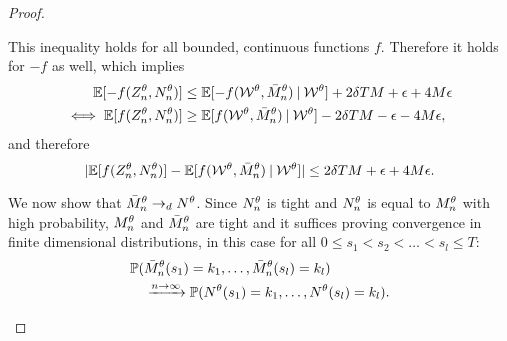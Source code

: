 \begin{proof}
\begin{proofpart}
This inequality holds for all bounded, continuous functions $f$. 
Therefore it holds for $-f$ as well, which implies
\begin{equation}
\begin{aligned}
\mathbb{E}[-f(Z_n^{\theta}, N_n^{\theta})] &\leq \mathbb{E}[-f(\mathcal{W}^{\theta}, \bar{M}_n^{\theta}) \: | \: \mathcal{W}^{\theta}]+ 2\delta T M  + \epsilon + 4M\epsilon \\
\iff  \mathbb{E}[f(Z_n^{\theta}, N_n^{\theta})] &\geq \mathbb{E}[f(\mathcal{W}^{\theta}, \bar{M}_n^{\theta}) \: | \: \mathcal{W}^{\theta}] - 2\delta T M  - \epsilon - 4M\epsilon,
\end{aligned}
\end{equation}
and therefore
\begin{equation} \label{E: Equality of Expectations}
	|\mathbb{E}[f(Z_n^{\theta}, N_n^{\theta})] - \mathbb{E}[f(\mathcal{W}^{\theta}, \bar{M}_n^{\theta}) \: | \: \mathcal{W}^{\theta}] | \leq 2\delta T M + \epsilon  + 4M\epsilon.
\end{equation}
\end{proofpart}



\begin{proofpart}
We now show that $\bar{M}_n^{\theta} \rightarrow_d N^{\theta}$.
Since $N_n^{\theta}$ is tight and $N_n^{\theta}$ is equal to $M_n^{\theta}$ with high probability,
$M_n^{\theta}$ and $\bar{M}_n^{\theta}$ are tight and it suffices proving convergence in finite dimensional distributions,
in this case for all $0 \leq s_1 < s_2 < \dots < s_l \leq T$:
\begin{equation} \label{E: convergence fdd}
\begin{aligned}
&\mathbb{P}( \bar{M}_n^{\theta}(s_1) = k_1, \dots, \bar{M}_n^{\theta}(s_l) = k_l ) \\
&\quad \xrightarrow{n \rightarrow \infty}  \mathbb{P}( N^{\theta}(s_1) = k_1, \dots, N^{\theta}(s_l) = k_l ).
\end{aligned}
\end{equation}


\end{proofpart}
\end{proof}
